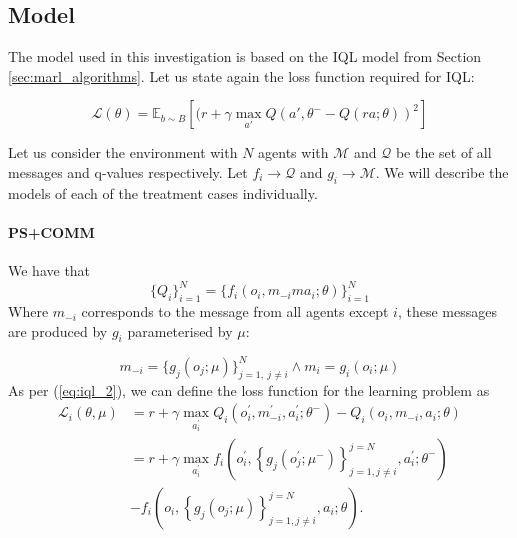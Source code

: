 \documentclass{article}
\begin{document}
\subsection{Model}

The model used in this investigation is based on the IQL model from Section \ref{sec:marl_algorithms}. Let us state again the loss function required for IQL:

\begin{equation}\label{eq:iql_2}
	\mathcal{L}(\theta) = \mathbb{E}_{b \sim B}\left[ (r + \gamma \max_{a'} Q(a', \theta^- - Q(ra; \theta) )^2 \right]
\end{equation}


Let us consider the environment with $N$ agents with $\mathcal{M}$ and $\mathcal{Q}$ be the set of all messages and q-values respectively. Let $f_i \to \mathcal{Q}$ and $g_i \to \mathcal{M}$. We will describe the models of each of the treatment cases individually.

\paragraph{PS+COMM} We have that 
\begin{equation}
	\{Q_i\}_{i=1}^N =\{f_i(o_i, m_{-i}m a_i; \theta)\}_{i = 1}^N
\end{equation}
Where $m_{-i}$ corresponds to the message from all agents except $i$, these messages are produced by $g_i$ parameterised by $\mu$:

\begin{equation}
	m_{-i} = \{ g_j(o_j; \mu) \}^N_{j = 1, \ j \neq i} \wedge m_i = g_i(o_i; \mu) 
\end{equation}
As per (\ref{eq:iql_2}), we can define the loss function for the learning problem as
\begin{equation}
\begin{aligned}
\mathcal{L}_i(\theta, \mu) & =r+\gamma \max _{a_i^{\prime}} Q_i\left(o_i^{\prime}, m_{-i}^{\prime}, a_i^{\prime} ; \theta^{-}\right)-Q_i\left(o_i, m_{-i}, a_i ; \theta\right) \\
& =r+\gamma \max _{a_i^{\prime}} f_i\left(o_i^{\prime},\left\{g_j\left(o_j^{\prime} ; \mu^{-}\right)\right\}_{j=1, j \neq i}^{j=N}, a_i^{\prime} ; \theta^{-}\right) \\
& -f_i\left(o_i,\left\{g_j\left(o_j ; \mu\right)\right\}_{j=1, j \neq i}^{j=N}, a_i ; \theta\right) .
\end{aligned}
\end{equation}
\end{document}
